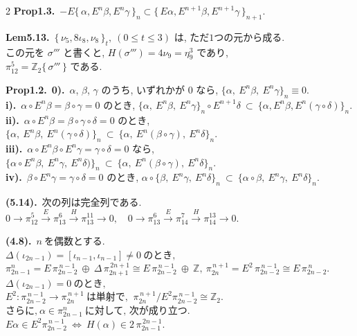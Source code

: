 \documentclass[10pt, leqno]{ltjsarticle}
\newcommand{\Ex}{E}        %
\newcommand{\todai}[2][]{\{\,#2\,\}_{#1}}      %
\newcommand{\gen}[1]{\{\,#1\,\}}       %
\newcommand{\pit}[2]{\pi_{#1}^{#2}}
\numberwithin{equation}{section}
\theoremstyle{plain}
\theoremstyle{definition}
\theoremstyle{remark}
\begin{document}
\begin{paracol}{2}
\noindent
\textbf{Prop1.3.}\
\(-E\todai[n]{\alpha, E^n\beta, E^n\gamma}
\subset \todai[n+1]{E\alpha, E^{n+1}\beta, E^{n+1}\gamma}\).

\noindent
\textbf{Lem5.13.}\
\(\todai[t]{\nu_5,8\iota_8,\nu_8},\ (0\leq t\leq3)\) 
は, ただ$1$つの元から成る. \\
この元を \(\sigma'''\) と書くと, 
\(H(\sigma''')=4\nu_9=\eta_9^3\) であり, \\
\(\pi_{12}^5=\mathbb{Z}_2\gen{\sigma'''}\)
である. 

\noindent
\textbf{Prop1.2.}\
\textbf{0).}\ $\alpha$, $\beta$, $\gamma$ のうち, いずれかが $0$ なら,
\(
\{\alpha,\ \Ex^n\beta,\ \Ex^n\gamma\}_n\equiv0.
\)\\
\textbf{i).}\ $\alpha\circ \Ex^n\beta=\beta\circ\gamma=0$ のとき,
\(
\{\alpha,\ \Ex^n\beta,\ \Ex^n\gamma\}_n\circ\Ex^{n+1}\delta\ \subset\ \{\alpha,\Ex^n \beta, \Ex^n(\gamma\circ\delta)\}_n.
\)\\
\textbf{ii).}\ $\alpha\circ \Ex^n\beta=\beta\circ\gamma\circ\delta=0$ のとき,
\(
\{\alpha,\ \Ex^n\beta,\ \Ex^n(\gamma\circ\delta)\}_n\ \subset\ \{\alpha,\ \Ex^n(\beta\circ\gamma),\ \Ex^n\delta\}_n .
\)\\
\textbf{iii).}\ $\alpha\circ\Ex^n\beta\circ\Ex^n\gamma=\gamma\circ\delta=0$ なら,
\(
\{\alpha\circ\Ex^n\beta,\ \Ex^n\gamma,\ \Ex^n\delta)\}_n\ \subset\ \{\alpha,\ \Ex^n(\beta\circ\gamma),\ \Ex^n\delta\}_n .
\)\\
\textbf{iv).}\ $\beta\circ\Ex^n\gamma=\gamma\circ\delta=0$ のとき,
\(
\alpha\circ\{\beta,\ \Ex^n\gamma,\ \Ex^n\delta\}_n\ \subset\ \{\alpha\circ\beta,\ \Ex^n\gamma,\ \Ex^n\delta\}_n .
\)

\noindent
\textbf{(5.14).}\
次の列は完全列である.\\
\(
0\to \pi^{5}_{12}\xrightarrow{E}\pi^{6}_{13}\xrightarrow{H}\pi^{11}_{13}\to0,
\quad
0\to \pi^{6}_{13}\xrightarrow{E}\pi^{7}_{14}\xrightarrow{H}\pi^{13}_{14}\to0 .
\)

\noindent
\textbf{(4.8).}\
\( n \ \text{を偶数とする. } \)\\
\(\Delta(\iota_{2n-1})=[\iota_{n-1},\iota_{n-1}]\ne0 \ \text{のとき, }\)\\
\(\pit{2n-1}{n}
=E\,\pit{2n-2}{\,n-1}\ \oplus\ \Delta\,\pit{2n+1}{\,2n+1}
\cong E\,\pit{2n-2}{\,n-1}\ \oplus\ \mathbb{Z},\ \pit{2n}{\,n+1} = E^{2}\,\pit{2n-2}{\,n-1} 
\cong E\,\pit{2n-2}{\,n}.\)\\
\(\Delta(\iota_{2n-1})=0 \ \text{のとき, }\)\\
\(E^{2}:\pit{2n-2}{\,n-1}\to\pit{2n}{\,n+1}\ \text{は単射で, }\
\pit{2n}{\,n+1}/E^{2}\pit{2n-2}{\,n-1}\cong\mathbb{Z}_2 . \)\\
\(\text{さらに,}\ \alpha\in\pit{2n-1}{n} \ \text{に対して, 次が成り立つ. }\)
\(E\alpha\in E^{2}\pit{2n-2}{\,n-1} \ \Leftrightarrow \
H(\alpha)\in 2\,\pit{2n-1}{\,2n-1} .\)



\end{paracol}
\end{document}

